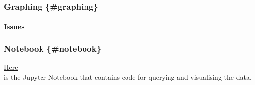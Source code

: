 \documentclass{article}
\begin{document}
\subsubsection{Graphing \{\#graphing\}}\label{graphing-graphing}

\paragraph{Issues}\label{issues-2}

\subsubsection{Notebook \{\#notebook\}}\label{notebook-notebook}

\href{https://nbviewer.jupyter.org/github/lyneca/info1903/blob/gh-pages/INFO1903.ipynb}{Here}\\
is the Jupyter Notebook that contains code for querying and visualising
the data.
\end{document}
